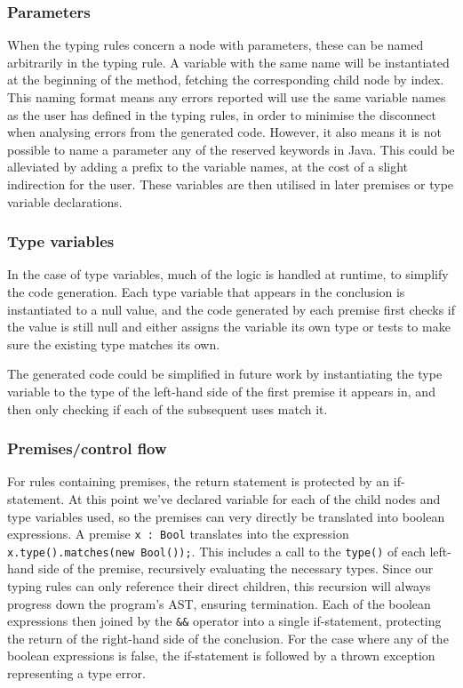 \documentclass[nofilelist]{cslthse-msc}
\newcommand{\CR}[1]{\textcolor{green!60!black}{[\textbf{CR}:#1]}}
\begin{document}
\subsubsection{Parameters}
When the typing rules concern a node with parameters, these can be named arbitrarily in the typing rule.
A variable with the same name will be instantiated at the beginning of the method, fetching the corresponding child node by index.
This naming format means any errors reported will use the same variable names as the user has defined in the typing rules, in order to minimise the disconnect when analysing errors from the generated code.
However, it also means it is not possible to name a parameter any of the reserved keywords in Java.
This could be alleviated by adding a prefix to the variable names, at the cost of a slight indirection for the user.
These variables are then utilised in later premises or type variable declarations.

\subsubsection{Type variables}
In the case of type variables, much of the logic is handled at runtime, to simplify the code generation.
Each type variable that appears in the conclusion is instantiated to a null value, and the code generated by each premise first checks if the value is still null and either assigns the variable its own type or tests to make sure the existing type matches its own.

The generated code could be simplified in future work by instantiating the type variable to the type of the left-hand side of the first premise it appears in, and then only checking if each of the subsequent uses match it.

\subsubsection{Premises/control flow}
For rules containing premises, the return statement is protected by an if-statement.
At this point we've declared variable for each of the child nodes and type variables used, so the premises can very directly be translated into boolean expressions.
A premise \lstinline{x : Bool} translates into the expression \lstinline{x.type().matches(new Bool());}.
This includes a call to the \lstinline{type()} of each left-hand side of the premise, recursively evaluating the necessary types.
Since our typing rules can only reference their direct children, this recursion will always progress down the program's AST, ensuring termination.
Each of the boolean expressions then joined by the \lstinline{&&} operator into a single if-statement, protecting the return of the right-hand side of the conclusion.
For the case where any of the boolean expressions is false, the if-statement is followed by a thrown exception representing a type error.
\end{document}
